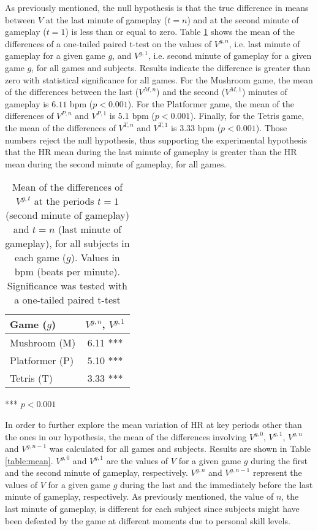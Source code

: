 As previously mentioned, the null hypothesis is that the true difference in means between $V$ at the last minute of gameplay ($t=n$) and at the second minute of gameplay ($t=1$) is less than or equal to zero. Table \ref{table:proof} shows the mean of the differences of a one-tailed paired t-test on the values of $V^{g,n}$, i.e. last minute of gameplay for a given game $g$, and $V^{g,1}$, i.e. second minute of gameplay for a given game $g$, for all games and subjects. Results indicate the difference is greater than zero with statistical significance for all games. For the Mushroom game, the mean of the differences between the last ($V^{M,n}$) and the second ($V^{M,1}$) minutes of gameplay is $6.11$ bpm ($p < 0.001$). For the Platformer game, the mean of the differences of $V^{P,n}$ and $V^{P,1}$ is $5.1$ bpm ($p < 0.001$). Finally, for the Tetris game, the mean of the differences of $V^{T,n}$ and $V^{T,1}$ is $3.33$ bpm ($p < 0.001$). Those numbers reject the null hypothesis, thus supporting the experimental hypothesis that the HR mean during the last minute of gameplay is greater than the HR mean during the second minute of gameplay, for all games.

\begin{table}
    \caption{Mean of the differences of $V^{g,t}$ at the periods $t=1$ (second minute of gameplay) and $t=n$ (last minute of gameplay), for all subjects in each game ($g$). Values in bpm (beats per minute). Significance was tested with a one-tailed paired t-test}
    \label{table:proof}
    \centering
  \begin{threeparttable}
     \begin{tabular}{lc}
        \toprule%
        \textbf{Game ($g$)} & \textbf{$V^{g,n}$, $V^{g,1}$} \\
        \toprule%
        Mushroom (M) & 6.11 ***  \\
        \midrule%
        Platformer (P) & 5.10 ***  \\
        \midrule%
        Tetris (T) & 3.33 *** \\
        \bottomrule%
     \end{tabular}
    \begin{tablenotes}
      \small
      \item[***]{$p < 0.001$}
    \end{tablenotes}
  \end{threeparttable}
\end{table}

In order to further explore the mean variation of HR at key periods other than the ones in our hypothesis, the mean of the differences involving $V^{g,0}$, $V^{g,1}$, $V^{g,n}$ and $V^{g,n-1}$ was calculated for all games and subjects. Results are shown in Table \ref{table:mean}. $V^{g,0}$ and $V^{g,1}$ are the values of $V$ for a given game $g$ during the first and the second minute of gameplay, respectively. $V^{g,n}$ and $V^{g,n-1}$ represent the values of $V$ for a given game $g$ during the last and the immediately before the last minute of gameplay, respectively. As previously mentioned, the value of $n$, the last minute of gameplay, is different for each subject since subjects might have been defeated by the game at different moments due to personal skill levels.

